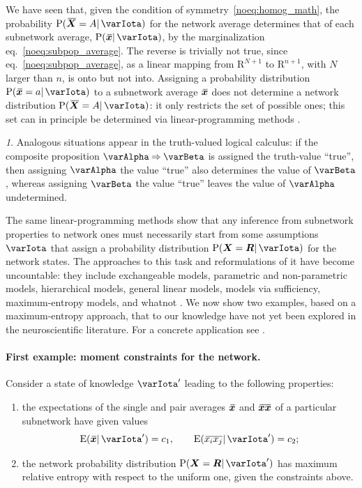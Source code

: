 \documentclass{article}
\theoremstyle{remark}
\theoremstyle{innote}
\newtheorem*{innote}{}
\newcommand*{\citep}{\parencites}
\newcommand*{\RR}{\bm{\mathrm{R}}}
\newcommand*{\limplies}{\mathbin{\Rightarrow}}%
\renewcommand*{\|}{\mathpunct{|}}%
\newcommand*{\p}{\mathrm{P}}%
\newcommand*{\eqn}{eq.}%
\newcommand*{\eg}{{e.g.}}
\newcommand*{\E}{\mathrm{E}}
\DeclarePairedDelimiter\expp{(}{)}
\newcommand*{\expe}{\E\expp}%
\theoremstyle{simple}
\newcommand*{\widebar}[1]{{\mkern1.5mu\skew{2}\overline{\mkern-1.5mu#1\mkern-1.5mu}\mkern 1.5mu}}
\newcommand*{\av}{\widebar} %
\newcommand*{\sav}{\widebar} %
\newcommand*{\yxx}{x}%
\newcommand*{\yx}{\bm{\yxx}}%
\newcommand*{\yxs}{\sav{\yx}}%
\newcommand*{\yX}{\bm{X}}%
\newcommand*{\yXf}{\av{\yX}}%
\newcommand*{\yR}{\bm{R}}%
\newcommand*{\yH}{\varIota}
\newcommand*{\yHa}{\varIota'}
\begin{document}
We have seen that, given the condition of symmetry~\eqref{noeq:homog_math},
the probability $\p(\yXf = A \|\yH)$ for the network average determines
that of each subnetwork average, $\p(\yxs \|\yH)$, by the
marginalization \eqn~\eqref{noeq:subpop_average}. The reverse is trivially
not true, since \eqn~\eqref{noeq:subpop_average}, as a linear mapping from
$\RR^{N+1}$ to $\RR^{n+1}$, with $N$ larger than $n$, is onto but not into.
Assigning a probability distribution $\p(\yxs = a \|\yH)$ to a
subnetwork average $\yxs$ does not determine a network distribution
$\p(\yXf = A\|\yH)$: it only restricts the set of possible ones; this
set can in principle be determined via linear-programming methods
\citep{hailperin1965,hailperin1984,hailperin1996,hailperin2006,hailperin2011}.
\begin{innote}
  Analogous situations appear in the truth-valued logical calculus: if the
  composite proposition $\varAlpha\limplies \varBeta$ is assigned the
  truth-value \enquote{true}, then assigning $\varAlpha$ the value
  \enquote{true} also determines the value of $\varBeta$, whereas assigning
  $\varBeta$ the value \enquote{true} leaves the value of $\varAlpha$
  undetermined.
\end{innote}
The same linear-programming methods show that any inference from subnetwork
properties to network ones must necessarily start from some assumptions
$\varIota$ that assign a probability distribution
$\p(\yX = \yR \| \varIota)$ for the network states. The approaches to
this task and reformulations of it have become uncountable: they include
exchangeable models, parametric and non-parametric models, hierarchical
models, general linear models, models via sufficiency, maximum-entropy
models, and whatnot
\citep[\eg:][]{jeffreys1931_r1973,jeffreys1939_r2003,jaynes1994_r2003,bernardoetal1994,gelmanetal1995_r2014,ghoshetal1997,kallenberg2005,gregory2005,sivia1996_r2006,ferreiraetal2007,dawid2013,damienetal2013}.
We now show two examples, based on a maximum-entropy approach, that to our
knowledge have not yet been explored in the neuroscientific literature. For
a concrete application see \citep{rostamietal2016b}.



\paragraph{First example: moment constraints for the network.}
\label{nosec:maxent_moments}
Consider a state of knowledge $\yHa$ leading to the following properties:
\begin{enumerate}%
\item the expectations of the single and pair averages $\yxs$ and
  $\sav{\yx\yx}$ of a particular subnetwork have given values
  \begin{equation}
    \label{noeq:constr_ex1}
    \expe{\yxs \| \yHa} = c_1, \qquad \expe{\sav{x_i x_j}\|\yHa} = c_2;
  \end{equation}
\item the network probability distribution $\p(\yX = \yR \|\yHa)$
  has maximum relative entropy with respect to the uniform one, given the
  constraints above.
\end{enumerate}
\end{document}

